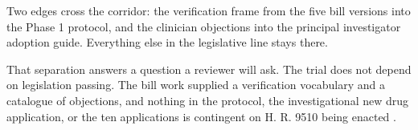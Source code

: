 Two edges cross the corridor: the verification frame from the five bill versions
into the Phase 1 protocol, and the clinician objections into the principal
investigator adoption guide. Everything else in the legislative line stays
there.

That separation answers a question a reviewer will ask. The trial does not
depend on legislation passing. The bill work supplied a verification vocabulary
and a catalogue of objections, and nothing in the protocol, the investigational
new drug application, or the ten applications is contingent on H. R. 9510 being
enacted \cite{hr9510billv5,clintrust}.
